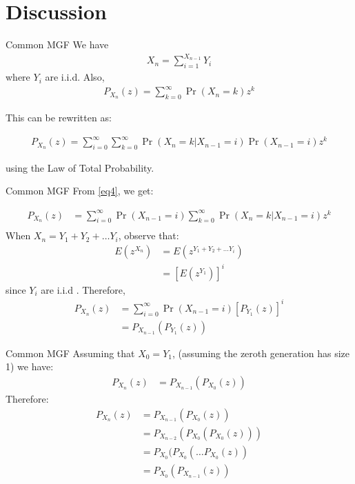 \documentclass{beamer}
\providecommand{\pr}[1]{\ensuremath{\Pr\left(#1\right)}}
\begin{document}
\section{Discussion}
\begin{frame}{Common MGF}
We have
\begin{align}
    X_n = \sum_{i=1}^{X_{n-1}} Y_i
\end{align}
where $Y_i$ are i.i.d. Also,
 \begin{align}
     P_{X_n}(z) = \sum_{k=0}^{\infty} \pr{X_n=k} z^k
 \end{align}
 
 This can be rewritten as:
 
 \begin{align}
    \label{eq4}
     P_{X_n}(z) = \sum_{i=0}^{\infty}\sum_{k=0}^{\infty} \pr{X_n=k | X_{n-1} = i} \pr{X_{n-1}=i} z^k
 \end{align}
 
 using the Law of Total Probability.
 
\end{frame}


\begin{frame}{Common MGF}
From \ref{eq4}, we get:

 \begin{align}
     P_{X_n}(z) &= \sum_{i=0}^{\infty} \pr{X_{n-1}=i} \sum_{k=0}^{\infty} \pr{X_n=k | X_{n-1} = i}  z^k \\
 \end{align}
 When $X_n = Y_1 + Y_2 + \ldots Y_i$, observe that: 
 \begin{align}
     E(z^{X_n}) &= E(z^{Y_1 + Y_2 + \ldots Y_i}) \\
     &= [E(z^{Y_1})]^i
 \end{align}
 since $Y_i$ are i.i.d . Therefore, 
 \begin{align}
    P_{X_n}(z) &= \sum_{i=0}^{\infty} \pr{X_{n-1}=i} [P_{Y_1}(z)]^i \\
    &= P_{X_{n-1}}(P_{Y_1}(z))
 \end{align}
 
\end{frame}

\begin{frame}{Common MGF}
Assuming that $X_0 = Y_1$, (assuming the zeroth generation has size 1) we have:
\begin{align}
     P_{X_n}(z) &=  P_{X_{n-1}}(P_{X_0}(z))
\end{align}
Therefore:
\begin{align}
    P_{X_n}(z) &=  P_{X_{n-1}}(P_{X_0}(z)) \\
    &= P_{X_{n-2}}(P_{X_0}(P_{X_0}(z))) \\
    &= P_{X_0}(P_{X_0}(\ldots P_{X_0}(z)) \\
    \label{eq15}
    &= P_{X_0}(P_{X_{n-1}}(z))
\end{align}

\end{frame}
\end{document}
